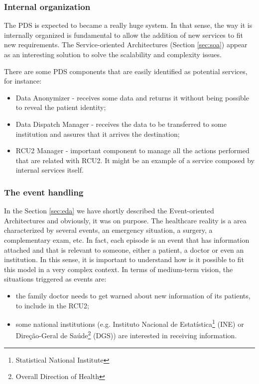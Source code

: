 
\subsubsection{Internal organization}

The PDS is expected to became a really huge system. In that sense, the way it is internally organized is fundamental to allow the addition of new services to fit new requirements. The Service-oriented Architectures (Section \ref{sec:soa}) appear as an interesting solution to solve the scalability and complexity issues.

There are some PDS components that are easily identified as potential services, for instance:
\begin{itemize}
\item Data Anonymizer - receives some data and returns it without being possible to reveal the patient identity;
\item Data Dispatch Manager - receives the data to be transferred to some institution and assures that it arrives the destination;
\item RCU2 Manager - important component to manage all the actions performed that are related with RCU2. It might be an example of a service composed by internal services itself.
\end{itemize}


\subsubsection{The event handling}

In the Section \ref{sec:eda} we have shortly described the Event-oriented Architectures and obviously, it was on purpose. The healthcare reality is a area characterized by several events, an emergency situation, a surgery, a complementary exam, etc. In fact, each episode is an event that has information attached and that is relevant to someone, either a patient, a doctor or even an institution. In this sense, it is important to understand how is it possible to fit this model in a very complex context. In terms of medium-term vision, the situations triggered as events are:
\begin{itemize}
\item the family doctor needs to get warned about new information of its patients, to include in the RCU2;
\item some national institutions (e.g. Instituto Nacional de Estatística\footnote{Statistical National Institute} (INE) or Direção-Geral de Saúde\footnote{Overall Direction of Health} (DGS)) are interested in receiving information.
\end{itemize}

